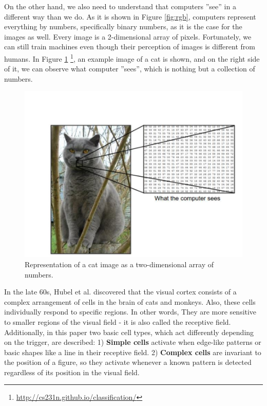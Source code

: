 On the other hand,  we also need to understand that computers  ”see” in a different way than we do. As it is shown in Figure \ref{fig:rgb}, computers represent everything by numbers,  specifically binary numbers,  as it is the case for the images as well. Every image is a 2-dimensional array of pixels. Fortunately, we can still train machines even though their perception of images is different from humans.  In Figure \ref{fig:image2d} \footnote{\url{http://cs231n.github.io/classification/}}, an example image of a cat is shown, and on the right side of it, we can observe what computer  ”sees”, which is nothing but a collection of numbers.\\
\begin{figure}[h!]
	\centering
  \includegraphics[width=0.7\linewidth]{figures/howcomputersees.png} 
  \caption{Representation of a cat image as a two-dimensional array of numbers.}
  \label{fig:image2d}
\end{figure}



In the late 60s, Hubel et al. discovered that the visual cortex consists of a complex arrangement of cells in the brain of cats and monkeys.  Also, these cells individually respond to specific regions.  In other words, They are more sensitive to smaller regions of the visual field - it is also called the receptive field.\\

Additionally,  in this paper two basic cell types, which act differently depending on the trigger, are described:  1) \textbf{Simple cells} activate when edge-like patterns or basic shapes like a line in their receptive field. 2) \textbf{Complex cells} are invariant to the position of a figure, so they activate whenever a known pattern is detected regardless of its position in the visual field.\\

